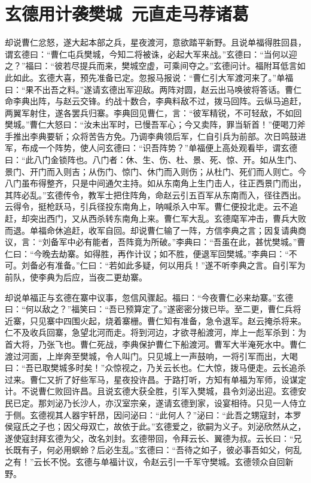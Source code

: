 \chapter{玄德用计袭樊城~元直走马荐诸葛}

却说曹仁忿怒，遂大起本部之兵，星夜渡河，意欲踏平新野。且说单福得胜回县，谓玄德曰：“曹仁屯兵樊城，今知二将被诛，必起大军来战。”玄德曰：“当何以迎之？”福曰：“彼若尽提兵而来，樊城空虚，可乘间夺之。”玄德问计。福附耳低言如此如此。玄德大喜，预先准备已定。忽报马报说：“曹仁引大军渡河来了。”单福曰：“果不出吾之料。”遂请玄德出军迎敌。两阵对圆，赵云出马唤彼将答话。曹仁命李典出阵，与赵云交锋。约战十数合，李典料敌不过，拨马回阵。云纵马追赶，两翼军射住，遂各罢兵归寨。李典回见曹仁，言：“彼军精锐，不可轻敌，不如回樊城。”曹仁大怒曰：“汝未出军时，已慢吾军心；今又卖阵，罪当斩首！”便喝刀斧手推出李典要斩；众将苦告方免。乃调李典领后军，仁自引兵为前部。次日鸣鼓进军，布成一个阵势，使人问玄德曰：“识吾阵势？”单福便上高处观看毕，谓玄德曰：“此八门金锁阵也。八门者：休、生、伤、杜、景、死、惊、开。如从生门、景门、开门而入则吉；从伤门、惊门、休门而入则伤；从杜门、死们而人则亡。今八门虽布得整齐，只是中间通欠主持。如从东南角上生门击人，往正西景门而出，其阵必乱。”玄德传令，教军士把住阵角，命赵云引五百军从东南而入，径往西出。云得令，挺枪跃马，引兵径投东南角上，呐喊杀入中军。曹仁便投北走。云不追赶，却突出西门，又从西杀转东南角上来。曹仁军大乱。玄德麾军冲击，曹兵大败而退。单福命休追赶，收军自回。却说曹仁输了一阵，方信李典之言；因复请典商议，言：“刘备军中必有能者，吾阵竟为所破。”李典曰：“吾虽在此，甚忧樊城。”曹仁曰：“今晚去劫寨。如得胜，再作计议；如不胜，便退军回樊城。”李典曰：“不可。刘备必有准备。”仁曰：“若如此多疑，何以用兵！”遂不听李典之言。自引军为前队，使李典为后应，当夜二更劫寨。

却说单福正与玄德在寨中议事，忽信风骤起。福曰：“今夜曹仁必来劫寨。”玄德曰：“何以敌之？”福笑曰：“吾已预算定了。”遂密密分拨已毕。至二更，曹仁兵将近寨，只见寨中四围火起，烧着寨栅。曹仁知有准备，急令退军。赵云掩杀将来。仁不及收兵回寨，急望北河而走。将到河边，才欲寻船渡河，岸上一彪军杀到：为首大将，乃张飞也。曹仁死战，李典保护曹仁下船渡河。曹军大半淹死水中。曹仁渡过河面，上岸奔至樊城，令人叫门。只见城上一声鼓响，一将引军而出，大喝曰：“吾已取樊城多时矣！”众惊视之，乃关云长也。仁大惊，拨马便走。云长追杀过来。曹仁又折了好些军马，星夜投许昌。于路打听，方知有单福为军师，设谋定计。不说曹仁败回许昌。且说玄德大获全胜，引军入樊城，县令刘泌出迎。玄德安民已定。那刘泌乃长沙人，亦汉室宗亲，遂请玄德到家，设宴相待。只见一人侍立于侧。玄德视其人器宇轩昂，因问泌曰：“此何人？”泌曰：“此吾之甥寇封，本罗侯寇氏之子也；因父母双亡，故依于此。”玄德爱之，欲嗣为义子。刘泌欣然从之，遂使寇封拜玄德为父，改名刘封。玄德带回，令拜云长、翼德为叔。云长曰：“兄长既有子，何必用螟蛉？后必生乱。”玄德曰：“吾待之如子，彼必事吾如父，何乱之有！”云长不悦。玄德与单福计议，令赵云引一千军守樊城。玄德领众自回新野。

